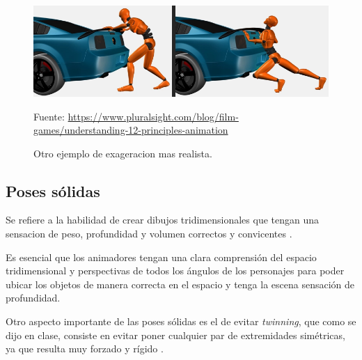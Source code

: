 \documentclass{article}
\begin{document}
\begin{figure}[H]
    \centering
    \includegraphics[width=\textwidth]{imagenes/Exaggeration.png}
    \caption{Otro ejemplo de exageracion mas realista.}
    \vspace{10pt}
    \footnotesize{Fuente: \url{https://www.pluralsight.com/blog/film-games/understanding-12-principles-animation}}
\end{figure}

\subsection{Poses sólidas}

Se refiere a la habilidad de crear dibujos tridimensionales que tengan una sensacion de peso, profundidad y volumen correctos y convicentes \cite{plural}.

\bigskip

Es esencial que los animadores tengan una clara comprensión del espacio tridimensional y perspectivas de todos los ángulos de los personajes para poder ubicar los objetos de manera correcta en el espacio y tenga la escena sensación de profundidad.

\bigskip

Otro aspecto importante de las poses sólidas es el de evitar \textit{twinning}, que como se dijo en clase, consiste en evitar poner cualquier par de extremidades simétricas, ya que resulta muy forzado y rígido \cite{plural}.
\end{document}
